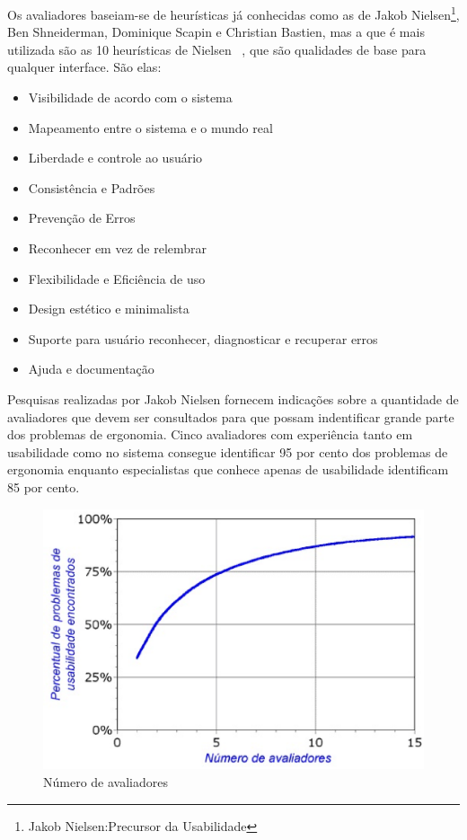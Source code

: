 	Os avaliadores baseiam-se de heurísticas já conhecidas como as de Jakob Nielsen\footnote{Jakob Nielsen:Precursor da Usabilidade }, Ben Shneiderman, Dominique Scapin e Christian Bastien, mas a que é mais utilizada são as 10 heurísticas de Nielsen ~, que são qualidades de base para qualquer interface. São elas:

	\begin{itemize}
		\item{Visibilidade de acordo com o sistema}
		\item{Mapeamento entre o sistema e o mundo real}
		\item{Liberdade e controle ao usuário}
		\item{Consistência e Padrões}
		\item{Prevenção de Erros}
		\item{Reconhecer em vez de relembrar}
		\item{Flexibilidade e Eficiência de uso}
		\item{Design estético e minimalista}
		\item{Suporte para usuário reconhecer, diagnosticar e recuperar erros}
		\item{Ajuda e documentação}
	\end{itemize}


	Pesquisas realizadas por Jakob Nielsen fornecem indicações sobre a quantidade de avaliadores que devem ser consultados para que possam indentificar grande parte dos problemas de ergonomia. Cinco avaliadores com experiência tanto em usabilidade como no sistema consegue identificar 95 por cento dos problemas de ergonomia enquanto especialistas que conhece apenas de usabilidade identificam 85 por cento.

\begin{figure}[h]
    \centering
    \includegraphics[keepaspectratio=true,scale=0.60]
      {figuras/avaliadores_heuristica.eps}
    \caption{Número de avaliadores~\cite{nielsen1994}}
    \label{avaliadores}
\end{figure}

